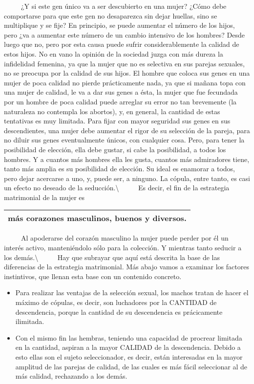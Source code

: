 ~ ~ ~ ¿Y si este gen único va a ser descubierto en una mujer? ¿Cómo debe
comportarse para que este gen no desaparezca sin dejar huellas, sino se
multiplique y se fije? En principio, se puede aumentar el número de los
hijos, pero ¿va a aumentar este número de un cambio intensivo de los
hombres? Desde luego que no, pero por esta causa puede sufrir
considerablemente la calidad de estos hijos. No en vano la opinión de la
sociedad juzga con más dureza la infidelidad femenina, ya que la mujer
que no es selectiva en sus parejas sexuales, no se preocupa por la
calidad de sus hijos. El hombre que coloca sus genes en una mujer de
poca calidad no pierde prácticamente nada, ya que si mañana topa con una
mujer de calidad, le va a dar sus genes a ésta, la mujer que fue
fecundada por un hombre de poca calidad puede arreglar su error no tan
brevemente (la naturaleza no contempla los abortos), y, en general, la
cantidad de estas tentativas es muy limitada. Para fijar con mayor
seguridad sus genes en sus descendientes, una mujer debe aumentar el
rigor de su selección de la pareja, para no diluir sus genes
eventualmente únicos, con cualquier cosa. Pero, para tener la
posibilidad de elección, ella debe gustar, si cabe la posibilidad, a
todos los hombres. Y a cuantos más hombres ella les gusta, cuantos más
admiradores tiene, tanto más amplia es su posibilidad de elección. Su
ideal es enamorar a todos, pero dejar acercarse a uno, y, puede ser, a
ninguno. La cópula, entre tanto, es casi un efecto no deseado de la
seducción.\textbackslash{} ~ ~ ~ Es decir, el fin de la estrategia
matrimonial de la mujer es

\begin{longtable}[]{@{}l@{}}
\toprule
más corazones masculinos, buenos y diversos.\tabularnewline
\bottomrule
\end{longtable}

~ ~ ~ Al apoderarse del corazón masculino la mujer puede perder por él
un interés activo, manteniéndolo sólo para la colección. Y mientras
tanto seducir a los demás.\textbackslash{} ~ ~ ~ Hay que subrayar que
aquí está descrita la base de las diferencias de la estrategia
matrimonial. Más abajo vamos a examinar los factores instintivos, que
llenan esta base con un contenido concreto.

\begin{itemize}
\tightlist
\item
  Para realizar las ventajas de la selección sexual, los machos tratan
  de hacer el máximo de cópulas, es decir, son luchadores por la
  CANTIDAD de descendencia, porque la cantidad de su descendencia es
  prácicamente ilimitada.
\item
  Con el mismo fin las hembras, teniendo una capacidad de procrear
  limitada en la cantidad, aspiran a la mayor CALIDAD de la
  descendencia. Debido a esto ellas son el sujeto seleccionador, es
  decir, están interesadas en la mayor amplitud de las parejas de
  calidad, de las cuales es más fácil seleccionar al de más calidad,
  rechazando a los demás.
\end{itemize}

